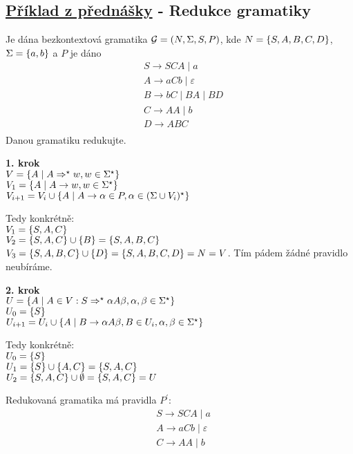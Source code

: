\subsection{\href{https://youtu.be/CWVxhYEyG4I?list=PLQL6z4JeTTQkLuzI78OTnfYBclE1g0UjS&t=5106}{Příklad z přednášky} - Redukce gramatiky}
Je dána bezkontextová gramatika $\mathcal{G} = (N, \Sigma, S, P)$, kde $N = \left\lbrace S,A,B,C,D \right\rbrace$, $\Sigma = \left\lbrace a,b \right\rbrace$ a $P$ je dáno
\begin{align*}
    & S \rightarrow SCA \mid a \\
    & A \rightarrow aCb \mid \varepsilon \\
    & B \rightarrow bC \mid BA \mid BD \\
    & C \rightarrow AA \mid b \\
    & D \rightarrow ABC \\
\end{align*}
Danou gramatiku redukujte.

\textbf{1. krok}\\
$V = \left\lbrace A \mid A \Rightarrow^\star w, w \in \Sigma^\star \right\rbrace$\\
$V_1 = \left\lbrace A \mid A \rightarrow w, w \in \Sigma^\star \right\rbrace$\\
$V_{i+1} = V_i \cup \left\lbrace A \mid A \rightarrow \alpha \in P, \alpha \in (\Sigma \cup V_i)^\star \right\rbrace$

Tedy konkrétně:\\
$V_1 = \left\lbrace S,A,C \right\rbrace$\\
$V_2 = \left\lbrace S,A,C \right\rbrace \cup \left\lbrace B \right\rbrace = \left\lbrace S,A,B,C \right\rbrace$\\
$V_3 = \left\lbrace S,A,B,C \right\rbrace \cup \left\lbrace D \right\rbrace = \left\lbrace S,A,B,C,D \right\rbrace = N = V$. Tím pádem žádné pravidlo neubíráme.

\textbf{2. krok}\\
$U = \left\lbrace A \mid A \in V : S \Rightarrow^\star \alpha A \beta, \alpha, \beta \in \Sigma^\star \right\rbrace$\\
$U_0 = \left\lbrace S \right\rbrace$\\
$U_{i+1} = U_i \cup \left\lbrace A \mid B \rightarrow \alpha A \beta, B \in U_i, \alpha, \beta \in \Sigma^\star \right\rbrace$

\begin{multicols}{2}
    Tedy konkrétně:\\
    $U_0 = \left\lbrace S \right\rbrace$\\
    $U_1 = \left\lbrace S \right\rbrace \cup \left\lbrace A,C \right\rbrace = \left\lbrace S,A,C \right\rbrace$\\
    $U_2 = \left\lbrace S,A,C \right\rbrace \cup \emptyset = \left\lbrace S,A,C \right\rbrace = U$

\columnbreak

    Redukovaná gramatika má pravidla $P^{'}$:
    \begin{align*}
        & S \rightarrow SCA \mid a \\
        & A \rightarrow aCb \mid \varepsilon \\
        & C \rightarrow AA \mid b \\
    \end{align*}
\end{multicols}

